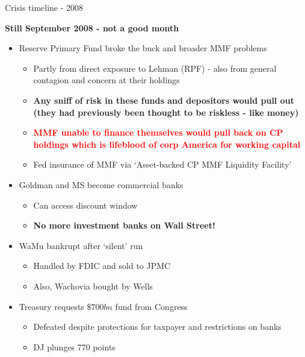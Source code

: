 

\begin{frame}{Crisis timeline - 2008}

\textbf{Still September 2008 - not a good month}
	\begin{itemize}
	\item[]	Reserve Primary Fund broke the buck and broader MMF problems
		\begin{itemize}
		\item	Partly from direct exposure to Lehman (RPF) - also from general contagion and concern at their holdings
		\item	\textbf{Any sniff of risk in these funds and depositors would pull out (they had previously been thought to be riskless - like money)}
		\item	\textcolor{red}{\textbf{MMF unable to finance themselves would pull back on CP holdings which is lifeblood of corp America for working capital}}
		\item	Fed insurance of MMF via `Asset-backed CP MMF Liquidity Facility'
		\end{itemize}
\vspace{1mm}
\item[]	Goldman and MS become commercial banks
	\begin{itemize}
	\item	Can access discount window
	\item	\textbf{No more investment banks on Wall Street!}
	\end{itemize}
\vspace{1mm}
\item[]	WaMu bankrupt after `silent' run
	\begin{itemize}
	\item	Handled by FDIC and sold to JPMC
	\item	Also, Wachovia bought by Wells
	\end{itemize}
\vspace{1mm}
\item[]	Treasury requests $\$700bn$ fund from Congress
	\begin{itemize}
	\item	Defeated despite protections for taxpayer and restrictions on banks
	\item	DJ plunges 770 points
	\end{itemize}
	\end{itemize}

\end{frame}

